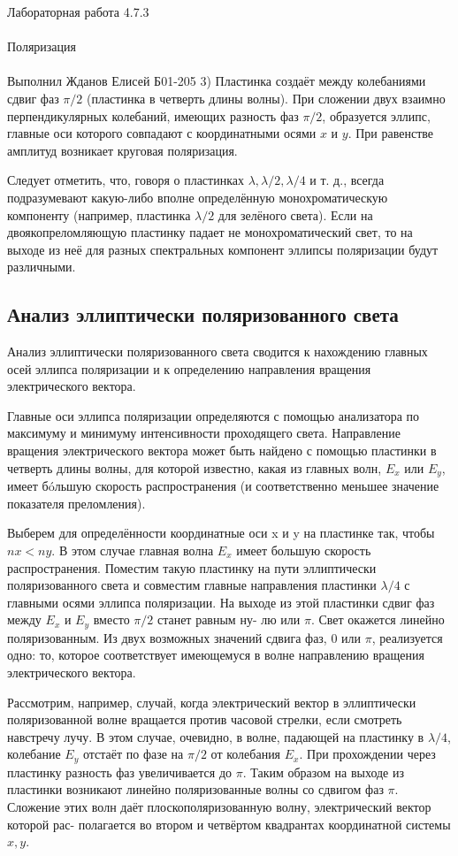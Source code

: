 \documentclass{astroedu-lab}
\begin{document}
\begin{problem}{\huge Лабораторная работа 4.7.3\\\\Поляризация\\\\Выполнил Жданов Елисей Б01-205}
3) Пластинка создаёт между колебаниями сдвиг фаз $ \pi/2 $ (пластинка
в четверть длины волны). При сложении двух взаимно перпендикулярных колебаний, имеющих разность фаз $ \pi/2 $, образуется эллипс, главные оси которого совпадают с координатными осями $ x $ и $ y $. При равенстве амплитуд возникает круговая поляризация.

Следует отметить, что, говоря о пластинках $ \lambda , \lambda/2, \lambda/4  $ и т. д., всегда подразумевают какую-либо вполне определённую монохроматическую
компоненту (например, пластинка $ \lambda/2 $ для зелёного света). Если на двоякопреломляющую пластинку падает не монохроматический свет, то на
выходе из неё для разных спектральных компонент эллипсы поляризации будут различными.

\subsection{Анализ эллиптически поляризованного света}

Анализ эллиптически поляризованного света сводится к нахождению главных осей
эллипса поляризации и к определению направления вращения электрического вектора.

Главные оси эллипса поляризации определяются с помощью анализатора по максимуму и минимуму интенсивности проходящего света.
Направление вращения электрического вектора может быть найдено
с помощью пластинки в четверть длины волны, для которой известно,
какая из главных волн, $ E_x $ или $ E_y $, имеет б\'{o}льшую скорость распространения (и соответственно меньшее значение показателя преломления).

Выберем для определённости координатные оси x и y на пластинке
так, чтобы $ nx < ny $. В этом случае главная волна $ E_x $ имеет большую
скорость распространения. Поместим такую пластинку на пути эллиптически поляризованного света и совместим главные направления пластинки $ \lambda/4 $ с главными осями эллипса поляризации. На выходе из этой
пластинки сдвиг фаз между $ E_x $ и $ E_y $ вместо $ \pi/2 $ станет равным ну-
лю или $ \pi $. Свет окажется линейно поляризованным. Из двух возможных значений сдвига фаз, 0 или $ \pi $, реализуется одно: то, которое соответствует имеющемуся в волне направлению вращения электрического вектора.

Рассмотрим, например, случай, когда электрический вектор в эллиптически поляризованной волне вращается против часовой стрелки,
если смотреть навстречу лучу. В этом случае, очевидно, в волне, падающей на пластинку в $ \lambda/4 $, колебание $ E_y $ отстаёт по фазе на $ \pi/2 $ от
колебания $ E_x $. При прохождении через пластинку разность фаз увеличивается до $ \pi $. Таким образом на выходе из пластинки возникают линейно поляризованные волны со сдвигом фаз $ \pi $. Сложение этих волн
даёт плоскополяризованную волну, электрический вектор которой рас-
полагается во втором и четвёртом квадрантах координатной системы
$ x, y $.


\end{problem}
\end{document}
